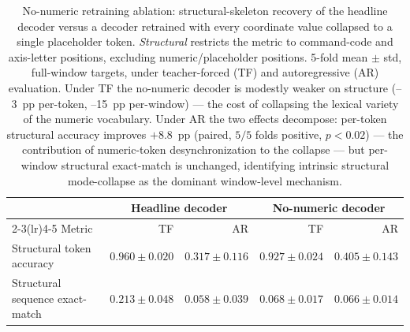 \begin{table}[ht]
\centering
\caption{No-numeric retraining ablation: structural-skeleton recovery of the
headline decoder versus a decoder retrained with every coordinate value
collapsed to a single placeholder token. \emph{Structural} restricts the
metric to command-code and axis-letter positions, excluding
numeric/placeholder positions. 5-fold mean $\pm$ std, full-window targets,
under teacher-forced (TF) and autoregressive (AR) evaluation. Under TF the
no-numeric decoder is modestly weaker on structure (--3~pp per-token,
--15~pp per-window) --- the cost of collapsing the lexical variety of the
numeric vocabulary. Under AR the two effects decompose: per-token structural
accuracy improves $+8.8$~pp (paired, $5/5$ folds positive, $p<0.02$) ---
the contribution of numeric-token desynchronization to the collapse --- but
per-window structural exact-match is unchanged, identifying intrinsic
structural mode-collapse as the dominant window-level mechanism.}
\label{tab:nonumeric}
\begin{tabular}{l r r r r}
\toprule
 & \multicolumn{2}{c}{Headline decoder} & \multicolumn{2}{c}{No-numeric decoder} \\
\cmidrule(lr){2-3}\cmidrule(lr){4-5}
Metric & TF & AR & TF & AR \\
\midrule
Structural token accuracy      & $0.960 \pm 0.020$ & $0.317 \pm 0.116$ & $0.927 \pm 0.024$ & $0.405 \pm 0.143$ \\
Structural sequence exact-match & $0.213 \pm 0.048$ & $0.058 \pm 0.039$ & $0.068 \pm 0.017$ & $0.066 \pm 0.014$ \\
\bottomrule
\end{tabular}
\end{table}
